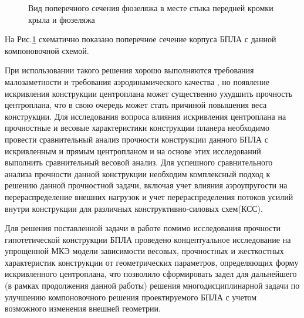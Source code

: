 \begin{figure}[ht]
\captionsetup{justification=centering}
\centering

\caption{Вид поперечного сечения фюзеляжа в месте стыка передней кромки крыла и фюзеляжа}
\label{fig:OriginalSectionWithEngine}
\end{figure}



На Рис.\ref{fig:OriginalSectionWithEngine} схематично показано поперечное сечение корпуса БПЛА с данной компоновочной схемой.

При использовании такого решения хорошо выполняются требования малозаметности и требования аэродинамического качества \cite{BPS}, но появление искривления конструкции центроплана может существенно ухудшить прочность центроплана, что в свою очередь может стать причиной повышения веса конструкции. Для исследования вопроса влияния искривления центроплана на прочностные и весовые характеристики конструкции планера необходимо провести сравнительный анализ прочности конструкции данного БПЛА с искривленным и прямым центропланом и на основе этих исследований выполнить сравнительный весовой анализ. Для успешного сравнительного анализа прочности данной конструкции необходим комплексный подход к решению данной прочностной задачи, включая учет влияния аэроупругости на перераспределение внешних нагрузок и учет перераспределения потоков усилий внутри конструкции для различных конструктивно-силовых схем(КСС).










Для решения поставленной задачи в работе помимо исследования прочности гипотетической конструкции БПЛА проведено концептуальное исследование на упрощенной МКЭ модели зависимости весовых, прочностных и жесткостных характеристик конструкции от геометрических параметров, определяющих форму искривленного центроплана, что позволило сформировать задел для дальнейшего (в рамках продолжения данной работы) решения многодисциплинарной задачи по улучшению компоновочного решения проектируемого БПЛА с учетом возможного изменения внешней геометрии. 


